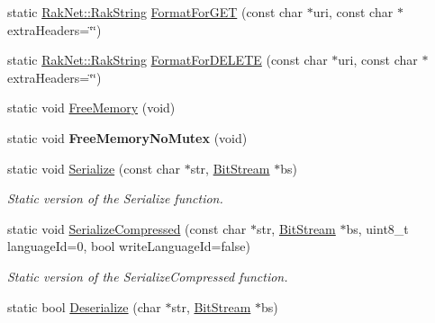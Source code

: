 \begin{DoxyCompactItemize}
\item 
static \hyperlink{class_rak_net_1_1_rak_string}{Rak\-Net\-::\-Rak\-String} \hyperlink{class_rak_net_1_1_rak_string_aff1544a8a50d06edecbc61073d88a3c6}{Format\-For\-G\-E\-T} (const char $\ast$uri, const char $\ast$extra\-Headers=\char`\"{}\char`\"{})
\item 
static \hyperlink{class_rak_net_1_1_rak_string}{Rak\-Net\-::\-Rak\-String} \hyperlink{class_rak_net_1_1_rak_string_ae4df821fd3d2759c66f204f301269aa4}{Format\-For\-D\-E\-L\-E\-T\-E} (const char $\ast$uri, const char $\ast$extra\-Headers=\char`\"{}\char`\"{})
\item 
static void \hyperlink{class_rak_net_1_1_rak_string_af2d5179a4683c4c47181fc4d3998cc9f}{Free\-Memory} (void)
\item 
\hypertarget{class_rak_net_1_1_rak_string_ac7890103174b5c3297e7c8d4eb004bec}{static void {\bfseries Free\-Memory\-No\-Mutex} (void)}\label{class_rak_net_1_1_rak_string_ac7890103174b5c3297e7c8d4eb004bec}

\item 
\hypertarget{class_rak_net_1_1_rak_string_ae7c203a84b2d03b70d97a7bb79c6a84e}{static void \hyperlink{class_rak_net_1_1_rak_string_ae7c203a84b2d03b70d97a7bb79c6a84e}{Serialize} (const char $\ast$str, \hyperlink{class_rak_net_1_1_bit_stream}{Bit\-Stream} $\ast$bs)}\label{class_rak_net_1_1_rak_string_ae7c203a84b2d03b70d97a7bb79c6a84e}

\begin{DoxyCompactList}\small\item\em Static version of the Serialize function. \end{DoxyCompactList}\item 
\hypertarget{class_rak_net_1_1_rak_string_a31afa166a0303f0cd3ceb6af4998ab73}{static void \hyperlink{class_rak_net_1_1_rak_string_a31afa166a0303f0cd3ceb6af4998ab73}{Serialize\-Compressed} (const char $\ast$str, \hyperlink{class_rak_net_1_1_bit_stream}{Bit\-Stream} $\ast$bs, uint8\-\_\-t language\-Id=0, bool write\-Language\-Id=false)}\label{class_rak_net_1_1_rak_string_a31afa166a0303f0cd3ceb6af4998ab73}

\begin{DoxyCompactList}\small\item\em Static version of the Serialize\-Compressed function. \end{DoxyCompactList}\item 
\hypertarget{class_rak_net_1_1_rak_string_ae17669a3f7b3ea2f1f50986d1d40edd7}{static bool \hyperlink{class_rak_net_1_1_rak_string_ae17669a3f7b3ea2f1f50986d1d40edd7}{Deserialize} (char $\ast$str, \hyperlink{class_rak_net_1_1_bit_stream}{Bit\-Stream} $\ast$bs)}\label{class_rak_net_1_1_rak_string_ae17669a3f7b3ea2f1f50986d1d40edd7}


\end{DoxyCompactItemize}
